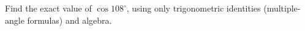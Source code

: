 Find the exact value of $\cos108^\circ$, using only trigonometric identities (multiple-angle formulas) and algebra.
